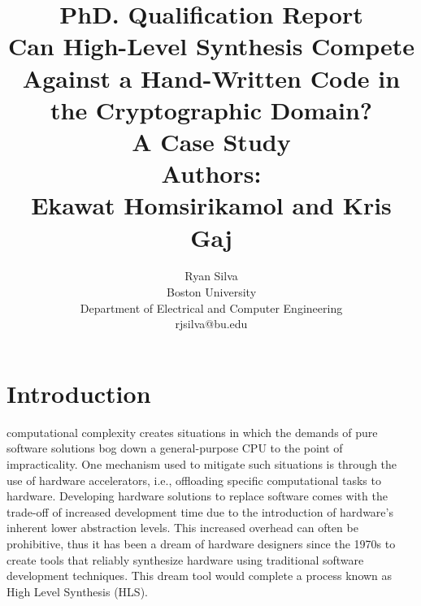\documentclass[11pt,journal,compsoc, onecolumn]{IEEEtran}
\begin{document}
\title{PhD. Qualification Report \\ \LARGE{\textbf{Can High-Level Synthesis Compete Against a Hand-Written Code in the Cryptographic Domain? \\ A Case Study \cite{sel}}} \\ Authors: \\ Ekawat Homsirikamol and Kris Gaj}

\author{Ryan Silva \\ Boston University \\ Department of Electrical and Computer Engineering \\ rjsilva@bu.edu
}


\maketitle


\IEEEdisplaynontitleabstractindextext
\IEEEpeerreviewmaketitle

\section{Introduction}
 computational complexity creates situations in which the demands of pure software solutions bog down a general-purpose CPU to the point of impracticality. One mechanism used to mitigate such situations is through the use of hardware accelerators, i.e., offloading specific computational tasks to hardware. Developing hardware solutions to replace software comes with the trade-off of increased development time due to the introduction of hardware's inherent lower abstraction levels. This increased overhead can often be prohibitive, thus it has been a dream of hardware designers since the 1970s to create tools that reliably synthesize hardware using traditional software development techniques\cite{1}. This dream tool would complete a process known as High Level Synthesis (HLS).
\end{document}
